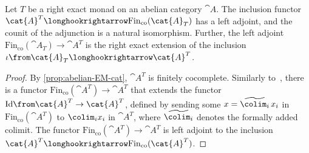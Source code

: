 \begin{proposition}\label{prop:badmagic}
  Let \(T\) be a right exact monad on an abelian category \(\cat{A}\).
  The inclusion functor \(\cat{A}^T \longhookrightarrow \mathrm{Fin}_{\mathrm{co}}(\cat{A}_T)\) has a left adjoint, and the counit of the adjunction is a natural isomorphism.
  Further, the left adjoint \(\mathrm{Fin}_{\mathrm{co}}(\cat{A}_T) \to \cat{A}^T\)
  is the right exact extension of the inclusion \(\iota \from \cat{A}_T \longhookrightarrow \cat{A}^T\).
\end{proposition}
\begin{proof}
  By \cref{prop:abelian-EM-cat},
  \(\cat{A}^T\) is finitely cocomplete.
  Similarly to~\cite[Proposition~6.3.1]{kashiwara06:categ},
  there is a functor \(\mathrm{Fin}_{\mathrm{co}}(\cat{A}^T) \to \cat{A}^T\)
  that extends the functor \(\mathrm{Id}\from \cat{A}^T \to \cat{A}^T\),
  defined by sending some \(x = \widetilde{\colim_i}\,x_i\) in \(\mathrm{Fin}_{\mathrm{co}}(\cat{A}^T)\)
  to \(\colim_i x_i\) in \(\cat{A}^T\),
  where \(\widetilde{\colim_i}\) denotes the formally added colimit.
  The functor \(\mathrm{Fin}_{\mathrm{co}}(\cat{A}^T) \to \cat{A}^T\)
  is left adjoint to the inclusion \(\cat{A}^T \longhookrightarrow \mathrm{Fin}_{\mathrm{co}}(\cat{A}^T)\).


\end{proof}
